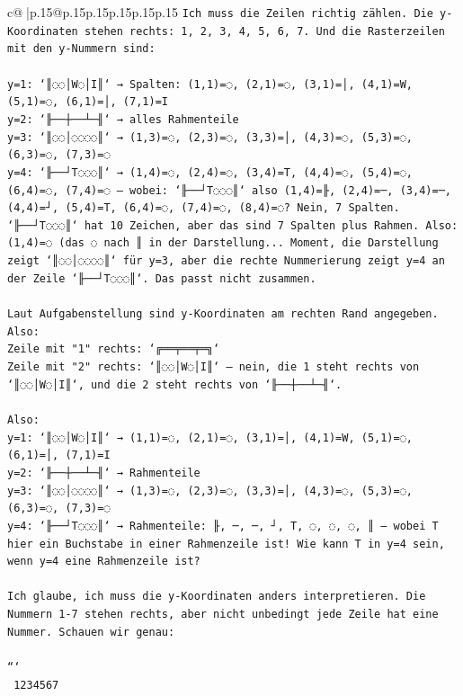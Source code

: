 \documentclass{article}
\begin{document}
{\begin{supertabular}{c@{$\;$}|p{.15\linewidth}@{}p{.15\linewidth}p{.15\linewidth}p{.15\linewidth}p{.15\linewidth}p{.15\linewidth}}
{{{\texttt{Ich muss die Zeilen richtig zählen. Die y{-}Koordinaten stehen rechts: 1, 2, 3, 4, 5, 6, 7. Und die Rasterzeilen mit den y{-}Nummern sind:} \\
\\ 
\texttt{y=1: `║◌◌│W◌│I║` → Spalten: (1,1)=◌, (2,1)=◌, (3,1)=│, (4,1)=W, (5,1)=◌, (6,1)=│, (7,1)=I} \\
\texttt{y=2: `╟──┼──┴─╢` → alles Rahmenteile} \\
\texttt{y=3: `║◌◌│◌◌◌◌║` → (1,3)=◌, (2,3)=◌, (3,3)=│, (4,3)=◌, (5,3)=◌, (6,3)=◌, (7,3)=◌} \\
\texttt{y=4: `╟──┘T◌◌◌║` → (1,4)=◌, (2,4)=◌, (3,4)=T, (4,4)=◌, (5,4)=◌, (6,4)=◌, (7,4)=◌ — wobei: `╟──┘T◌◌◌║` also (1,4)=╟, (2,4)=─, (3,4)=─, (4,4)=┘, (5,4)=T, (6,4)=◌, (7,4)=◌, (8,4)=◌? Nein, 7 Spalten. `╟──┘T◌◌◌║` hat 10 Zeichen, aber das sind 7 Spalten plus Rahmen. Also: (1,4)=◌ (das ◌ nach ║ in der Darstellung... Moment, die Darstellung zeigt `║◌◌│◌◌◌◌║` für y=3, aber die rechte Nummerierung zeigt y=4 an der Zeile `╟──┘T◌◌◌║`. Das passt nicht zusammen.} \\
\\ 
\texttt{Laut Aufgabenstellung sind y{-}Koordinaten am rechten Rand angegeben. Also:} \\
\texttt{Zeile mit "1" rechts: `╔══╤══╤═╗`} \\
\texttt{Zeile mit "2" rechts: `║◌◌│W◌│I║` — nein, die 1 steht rechts von `║◌◌│W◌│I║`, und die 2 steht rechts von `╟──┼──┴─╢`.} \\
\\ 
\texttt{Also:} \\
\texttt{y=1: `║◌◌│W◌│I║` → (1,1)=◌, (2,1)=◌, (3,1)=│, (4,1)=W, (5,1)=◌, (6,1)=│, (7,1)=I} \\
\texttt{y=2: `╟──┼──┴─╢` → Rahmenteile} \\
\texttt{y=3: `║◌◌│◌◌◌◌║` → (1,3)=◌, (2,3)=◌, (3,3)=│, (4,3)=◌, (5,3)=◌, (6,3)=◌, (7,3)=◌} \\
\texttt{y=4: `╟──┘T◌◌◌║` → Rahmenteile: ╟, ─, ─, ┘, T, ◌, ◌, ◌, ║ — wobei T hier ein Buchstabe in einer Rahmenzeile ist! Wie kann T in y=4 sein, wenn y=4 eine Rahmenzeile ist?} \\
\\ 
\texttt{Ich glaube, ich muss die y{-}Koordinaten anders interpretieren. Die Nummern 1{-}7 stehen rechts, aber nicht unbedingt jede Zeile hat eine Nummer. Schauen wir genau:} \\
\\ 
\texttt{```} \\
\texttt{ 1234567} \\
}}}
\end{supertabular}}
\end{document}
